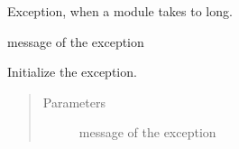 \documentclass[letterpaper,10pt,english]{sphinxmanual}
\begin{document}
\begin{fulllineitems}
\label{\detokenize{api:my_exceptions.TooLongException}}
Exception, when a module takes to long.

\begin{fulllineitems}
\label{\detokenize{api:my_exceptions.TooLongException.value}}
message of the exception

\end{fulllineitems}


\begin{fulllineitems}
\label{\detokenize{api:my_exceptions.TooLongException.__init__}}
Initialize the exception.
\begin{quote}\begin{description}
\item[{Parameters}] \leavevmode
{} \textendash{} message of the exception

\end{description}\end{quote}

\end{fulllineitems}


\end{fulllineitems}

\label{\detokenize{api:module-simple_check}}
\end{document}
